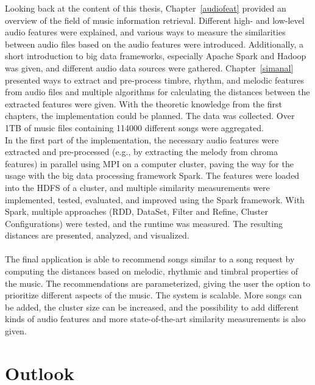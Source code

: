 Looking back at the content of this thesis, Chapter~\ref{audiofeat} provided an overview of the field of music information retrieval. Different high- and low-level audio features were explained, and various ways to measure the similarities between audio files based on the audio features were introduced. Additionally, a short introduction to big data frameworks, especially Apache Spark and Hadoop was given, and different audio data sources were gathered. Chapter~\ref{simanal} presented ways to extract and pre-process timbre, rhythm, and melodic features from audio files and multiple algorithms for calculating the distances between the extracted features were given. With the theoretic knowledge from the first chapters, the implementation could be planned. The data was collected. Over 1TB of music files containing 114000 different songs were aggregated.\\ 
In the first part of the implementation, the necessary audio features were extracted and pre-processed (e.g., by extracting the melody from chroma features) in parallel using MPI on a computer cluster, paving the way for the usage with the big data processing framework Spark.
The features were loaded into the HDFS of a cluster, and multiple similarity measurements were implemented, tested, evaluated, and improved using the Spark framework. With Spark, multiple approaches (RDD, DataSet, Filter and Refine, Cluster Configurations) were tested, and the runtime was measured. The resulting distances are presented, analyzed, and visualized.\\
\ \\
The final application is able to recommend songs similar to a song request by computing the distances based on melodic, rhythmic and timbral properties of the music. The recommendations are parameterized, giving the user the option to prioritize different aspects of the music. The system is scalable. More songs can be added, the cluster size can be increased, and the possibility to add different kinds of audio features and more state-of-the-art similarity measurements is also given. 

\section{Outlook}

